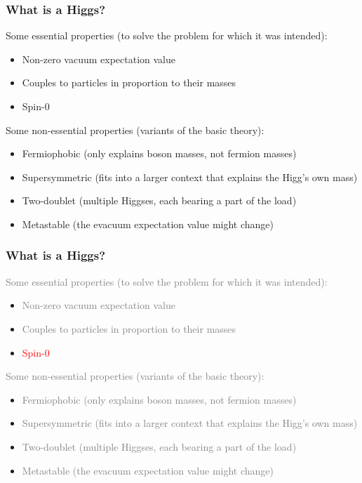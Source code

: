 \documentclass[compress]{beamer}
\begin{document}
\begin{frame}
\frametitle{What is a Higgs?}

Some essential properties (to solve the problem for which it was intended):
\begin{itemize}
\item Non-zero vacuum expectation value
\item Couples to particles in proportion to their masses
\item Spin-0
\end{itemize}

Some non-essential properties (variants of the basic theory):
\begin{itemize}
\item Fermiophobic (only explains boson masses, not fermion masses)
\item Supersymmetric (fits into a larger context that explains the Higg's own mass)
\item Two-doublet (multiple Higgses, each bearing a part of the load)
\item Metastable (the evacuum expectation value might change)
\end{itemize}
\end{frame}

\begin{frame}
\frametitle{What is a Higgs?}

\textcolor{gray}{Some essential properties (to solve the problem for which it was intended):}
\begin{itemize}
\item \textcolor{gray}{Non-zero vacuum expectation value}
\item \textcolor{gray}{Couples to particles in proportion to their masses}
\item \textcolor{red}{Spin-0}
\end{itemize}

\textcolor{gray}{Some non-essential properties (variants of the basic theory):}
\begin{itemize}
\item \textcolor{gray}{Fermiophobic (only explains boson masses, not fermion masses)}
\item \textcolor{gray}{Supersymmetric (fits into a larger context that explains the Higg's own mass)}
\item \textcolor{gray}{Two-doublet (multiple Higgses, each bearing a part of the load)}
\item \textcolor{gray}{Metastable (the evacuum expectation value might change)}
\end{itemize}
\end{frame}
\end{document}

